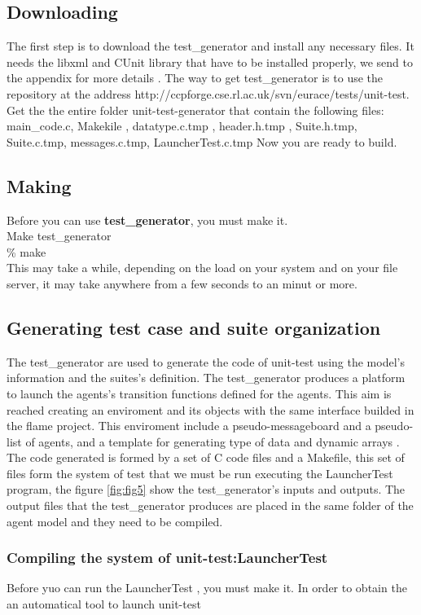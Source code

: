 \documentclass[a4paper,10pt]{article}
\begin{document}
\subsection{Downloading}
The first step is to download the test\_generator and install any necessary files. 
It needs the  libxml and CUnit library that have to be installed properly, we send to the appendix for more details .
The  way to get test\_generator is to use the repository at the address  http://ccpforge.cse.rl.ac.uk/svn/eurace/tests/unit-test. 
Get the the entire folder unit-test-generator that contain the following files:
main\_code.c, Makekile , datatype.c.tmp , header.h.tmp , Suite.h.tmp,
Suite.c.tmp, messages.c.tmp, LauncherTest.c.tmp
Now you are ready to build.
\subsection{Making}
Before you can use \textbf{test\_generator}, you must make it. \\
Make test\_generator\\
\% make \\
This may take a while, depending on the load on your system and on your file server,
it may take anywhere from a few seconds to an minut or more.
\subsection{Generating test case and suite organization}
The test\_generator are used to generate the code of unit-test using the model's information and the suites's definition.
The test\_generator  produces a platform to launch the agents's transition functions defined for the agents. This aim is reached creating an enviroment and its objects with the same interface builded in the flame project. This enviroment include a pseudo-messageboard and a pseudo-list of agents, and a template for generating  type of data and dynamic arrays .   
The code generated is formed by a set of  C code files and a Makefile, this set of files form the system of test that we must be run executing the LauncherTest program, the figure \ref{fig:fig5} show the test\_generator's inputs and outputs. The output files that the test\_generator produces are placed in the same folder of the agent model and they need to be compiled.
\subsubsection{Compiling the system of unit-test:LauncherTest }
Before yuo can run the LauncherTest , you must make it.
In order to obtain the an automatical tool to launch unit-test 
\end{document}
